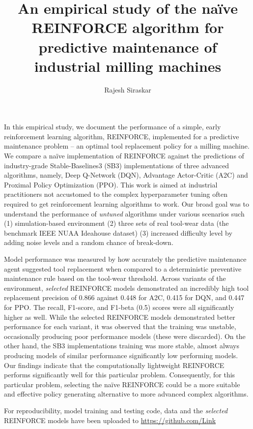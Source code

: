 \documentclass[a4paper, 12pt]{article}
\title{An empirical study of the na\"ive REINFORCE algorithm for predictive maintenance of industrial milling machines}
\author{Rajesh Siraskar}
\renewenvironment{abstract}
{\small
	\begin{center}
		\bfseries \abstractname\vspace{-.5em}\vspace{0pt}
	\end{center}
	\list{}{
		\setlength{\leftmargin}{.25cm}%
		\setlength{\rightmargin}{\leftmargin}%
	}%
	\item\relax}
{\endlist}
\begin{document}
\maketitle

\begin{abstract}
In this empirical study, we document the performance of a simple, early reinforcement learning algorithm, REINFORCE, implemented for a predictive maintenance problem -- an optimal tool replacement policy for a milling machine. We compare a na\"ive implementation of REINFORCE against the predictions of industry-grade Stable-Baselines3 (SB3) implementations of three advanced algorithms, namely, Deep Q-Network (DQN), Advantage Actor-Critic (A2C) and Proximal Policy Optimization (PPO). This work is aimed at industrial practitioners not accustomed to the complex hyperparameter tuning often required to get reinforcement learning algorithms to work. Our broad goal was to understand the performance of \textit{untuned} algorithms under various scenarios such (1) simulation-based environment (2) three sets of real tool-wear data (the benchmark IEEE NUAA Ideahouse dataset) (3) increased difficulty level by adding noise levels and a random chance of break-down. 

Model performance was measured by how accurately the predictive maintenance agent suggested tool replacement when compared to a deterministic preventive maintenance rule based on the tool-wear threshold. Across variants of the environment, \textit{selected} REINFORCE models demonstrated an incredibly high tool replacement precision of 0.866 against 0.448 for A2C, 0.415 for DQN, and 0.447 for PPO. The recall, F1-score, and F1-beta (0.5) scores were all significantly higher as well. While the selected REINFORCE models demonstrated better performance for each variant, it was observed that the training was unstable, occasionally producing poor performance models (these were discarded). On the other hand, the SB3 implementations training was more stable, almost always producing models of similar performance significantly low performing models. Our findings indicate that the computationally lightweight REINFORCE performs significantly well for this particular problem. Consequently, for this particular problem, selecting the na\"ive REINFORCE could be a more suitable and effective policy generating alternative to more advanced complex algorithms. 

For reproducibility, model training and testing code, data and the \textit{selected} REINFORCE models have been uploaded to \href{https://github.com/Rajesh-Siraskar/Empirical-Study\_REINFORCE-for-predictive-maintenance}{https://github.com/Link} 
\end{abstract}
\end{document}
